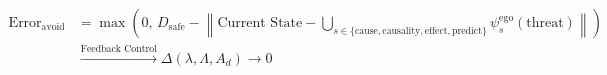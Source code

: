 \begin{align}
    \text{Error}_{\mathrm{avoid}} &= \max\left( 0,\, D_{\mathrm{safe}} - \left\| \text{Current State} - \bigcup_{s \in \{\mathrm{cause}, \mathrm{causality}, \mathrm{effect}, \mathrm{predict}\}} \psi^{\mathrm{ego}}_s(\mathrm{threat}) \right\| \right) \nonumber \\
                                  &\xrightarrow{\text{Feedback Control}} \Delta (\lambda, \Lambda, A_d) \longrightarrow 0 \label{eq:avoid_feedback}
\end{align}


